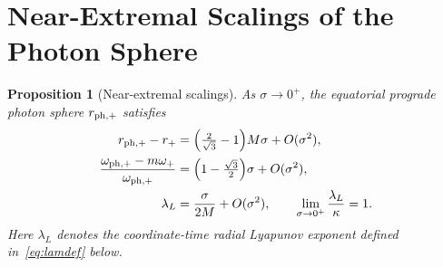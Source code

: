 \documentclass[11pt,a4paper]{article}
\newtheorem{proposition}[theorem]{Proposition}
\theoremstyle{remark}
\theoremstyle{definition}
\begin{document}
\section{Near-Extremal Scalings of the Photon Sphere}
\label{sec:triple}

\begin{proposition}[Near-extremal scalings]
\label{prop:triple}
As $\sigma\to 0^+$, the equatorial prograde photon sphere $r_{{\rm ph},+}$ satisfies
\begin{align}
r_{{\rm ph},+} - r_+ &= \Bigl(\tfrac{2}{\sqrt3} - 1\Bigr) M\sigma + O(\sigma^2), \label{eq:rph}\\
\frac{\omega_{{\rm ph},+} - m\omega_+}{\omega_{{\rm ph},+}} &= \Bigl(1 - \tfrac{\sqrt3}{2}\Bigr)\sigma + O(\sigma^2), \label{eq:gapph}\\
\lambda_L &= \frac{\sigma}{2M} + O(\sigma^2), \qquad \lim_{\sigma\to0^+}\frac{\lambda_L}{\kappa} = 1. \label{eq:lam}
\end{align}
Here $\lambda_L$ denotes the coordinate-time radial Lyapunov exponent defined in~\eqref{eq:lamdef} below.
\end{proposition}
\end{document}
